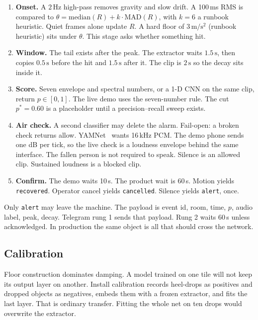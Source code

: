 \documentclass[sigconf]{acmart}
\begin{document}
\begin{enumerate}[leftmargin=*,itemsep=3pt]
\item \textbf{Onset.} A \(2\,\mathrm{Hz}\) high-pass removes gravity and slow drift. A 100\,ms RMS is compared to
\(\theta=\mathrm{median}(R)+k\cdot\mathrm{MAD}(R)\), with \(k=6\) a runbook heuristic. Quiet frames alone update \(R\). A hard floor of \(3\,\mathrm{m/s^2}\) (runbook heuristic) sits under \(\theta\). This stage asks whether something hit.
\item \textbf{Window.} The tail exists after the peak. The extractor waits \(1.5\,\mathrm{s}\), then copies \(0.5\,\mathrm{s}\) before the hit and \(1.5\,\mathrm{s}\) after it. The clip is \(2\,\mathrm{s}\) so the decay sits inside it.
\item \textbf{Score.} Seven envelope and spectral numbers, or a 1-D CNN on the same clip, return \(p\in[0,1]\). The live demo uses the seven-number rule. The cut \(p^*=0.60\) is a placeholder until a precision--recall sweep exists.
\item \textbf{Air check.} A second classifier may delete the alarm. Fail-open: a broken check returns allow. YAMNet~\cite{gemmeke2017} wants 16\,kHz PCM. The demo phone sends one dB per tick, so the live check is a loudness envelope behind the same interface. The fallen person is not required to speak. Silence is an allowed clip. Sustained loudness is a blocked clip.
\item \textbf{Confirm.} The demo waits 10\,s. The product wait is 60\,s. Motion yields \texttt{recovered}. Operator cancel yields \texttt{cancelled}. Silence yields \texttt{alert}, once.
\end{enumerate}

Only \texttt{alert} may leave the machine. The payload is event id, room, time, \(p\), audio label, peak, decay. Telegram rung 1 sends that payload. Rung 2 waits 60\,s unless acknowledged. In production the same object is all that should cross the network.

\subsection{Calibration}

Floor construction dominates damping. A model trained on one tile will not keep its output layer on another. Install calibration records heel-drops as positives and dropped objects as negatives, embeds them with a frozen extractor, and fits the last layer. That is ordinary transfer. Fitting the whole net on ten drops would overwrite the extractor.
\end{document}
